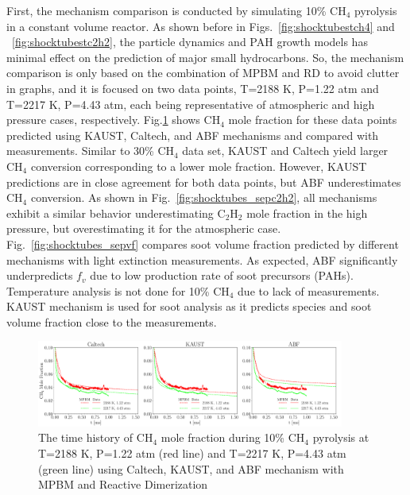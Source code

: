 First, the mechanism comparison is conducted by simulating 10\% $\mathrm{CH_4}$ pyrolysis in a constant volume reactor. As shown before in Figs.~\ref{fig:shocktubestch4} and ~\ref{fig:shocktubestc2h2}, the particle dynamics and PAH growth models has minimal effect on the prediction of major small hydrocarbons. So, the mechanism comparison is only based on the combination of MPBM and RD to avoid clutter in graphs, and it is focused on two data points, T=2188 K, P=1.22 atm and T=2217 K, P=4.43 atm, each being representative of atmospheric and high pressure cases, respectively. Fig.\ref{fig:shocktubes_sepch4} shows $\mathrm{CH_4}$ mole fraction for these data points predicted using KAUST, Caltech, and ABF mechanisms and compared with measurements. Similar to 30\% $\mathrm{CH_4}$ data set, KAUST and Caltech yield larger $\mathrm{CH_4}$ conversion corresponding to a lower mole fraction. However, KAUST predictions are in close agreement for both data points, but ABF underestimates $\mathrm{CH_4}$ conversion. As shown in Fig.~\ref{fig:shocktubes_sepc2h2}, all mechanisms exhibit a similar behavior underestimating $\mathrm{C_2H_2}$ mole fraction in the high pressure, but overestimating it for the atmospheric case. Fig.~\ref{fig:shocktubes_sepvf} compares soot volume fraction predicted by different mechanisms with light extinction measurements. As expected, ABF significantly underpredicts $f_v$ due to low production rate of soot precursors (PAHs). Temperature analysis is not done for 10\% $\mathrm{CH_4}$ due to lack of measurements. KAUST mechanism is used for soot analysis as it predicts species and soot volume fraction close to the measurements.

\begin{figure}[H]
	\centering
	\includegraphics[width=0.9\textwidth]{Figures/Results/Shocktube/Stanford/September/stsh_sepmechs_CH4.pdf}
	\caption{The time history of $\mathrm{CH_4}$ mole fraction during 10\% $\mathrm{CH_4}$ pyrolysis at T=2188 K, P=1.22 atm (red line) and T=2217 K, P=4.43 atm (green line) using Caltech, KAUST, and ABF mechanism with MPBM and Reactive Dimerization}
	\label{fig:shocktubes_sepch4} 
\end{figure}

